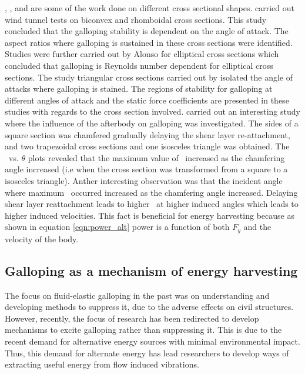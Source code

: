   
\citet{Naudascher1993}, \citet{Ruscheweyh1996}, \citet{Deniz1997} and \citet{Weaver2005} are some of the work done on different cross sectional shapes. \citet{Alonso2009} carried out wind tunnel tests on biconvex and rhomboidal cross sections. This study concluded that the galloping stability is dependent on the angle of attack. The aspect ratios where galloping is sustained in these cross sections were identified. Studies were further carried out by Alonso for elliptical cross sections \citep{Alonso2010} which concluded that galloping is Reynolds number dependent for elliptical cross sections. The study triangular cross sections carried out by \citep{Alonso2005} isolated the angle of attacks where galloping is stained. The regions of stability for galloping at different angles of attack and the static force coefficients are presented in these studies with regards to the cross section involved. \citet{Luo1994} carried out an interesting study where the influence of the afterbody on galloping was investigated. The sides of a square section was chamfered gradually delaying the shear layer re-attachment, and two trapezoidal cross sections and one isosceles triangle was obtained. The \cy\ vs. $\theta$ plots revealed that the maximum value of \cy\ increased as the chamfering angle increased (i.e when the cross section was transformed from a square to a isosceles triangle). Anther interesting observation was that the incident angle where maximum \cy\ occurred increased as the chamfering angle increased. Delaying shear layer reattachment leads to higher \cy\ at higher induced angles which leads to higher induced velocities. This fact is beneficial for energy harvesting because as shown in equation \ref{eqn:power_alt} power is a function of both $F_{y}$ and the velocity of the body.  


\subsection{Galloping as a mechanism of energy harvesting}

The focus on fluid-elastic galloping in the past was on understanding and developing methods to suppress it, due to the adverse effects on civil structures. However, recently, the focus of research has been redirected to develop mechanisms to excite galloping rather than suppressing it. This is due to the recent demand for alternative energy sources with minimal environmental impact. Thus, this demand for alternate energy has lead researchers to develop ways of extracting useful energy from flow induced vibrations.

